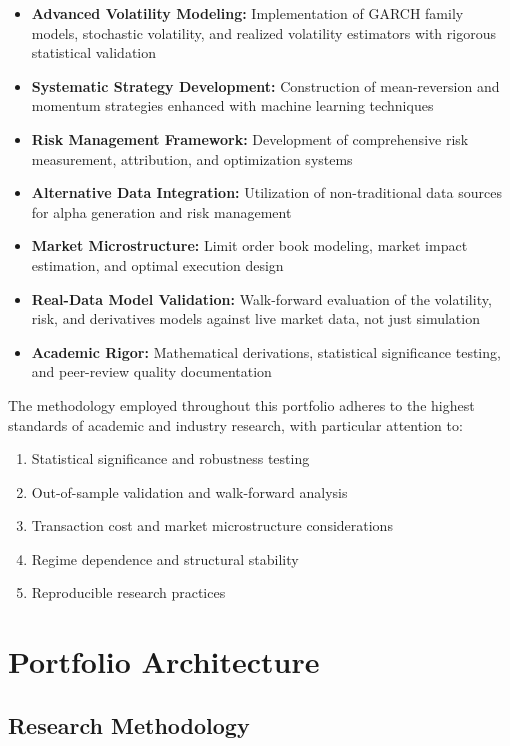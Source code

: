 \documentclass[12pt,a4paper]{article}
\begin{document}
\begin{itemize}[leftmargin=*]
    \item \textbf{Advanced Volatility Modeling:} Implementation of GARCH family models, stochastic volatility, and realized volatility estimators with rigorous statistical validation
    \item \textbf{Systematic Strategy Development:} Construction of mean-reversion and momentum strategies enhanced with machine learning techniques
    \item \textbf{Risk Management Framework:} Development of comprehensive risk measurement, attribution, and optimization systems
    \item \textbf{Alternative Data Integration:} Utilization of non-traditional data sources for alpha generation and risk management
    \item \textbf{Market Microstructure:} Limit order book modeling, market impact estimation, and optimal execution design
    \item \textbf{Real-Data Model Validation:} Walk-forward evaluation of the volatility, risk, and derivatives models against live market data, not just simulation
    \item \textbf{Academic Rigor:} Mathematical derivations, statistical significance testing, and peer-review quality documentation
\end{itemize}

The methodology employed throughout this portfolio adheres to the highest standards of academic and industry research, with particular attention to:
\begin{enumerate}
    \item Statistical significance and robustness testing
    \item Out-of-sample validation and walk-forward analysis
    \item Transaction cost and market microstructure considerations
    \item Regime dependence and structural stability
    \item Reproducible research practices
\end{enumerate}

\section{Portfolio Architecture}

\subsection{Research Methodology}
\end{document}
